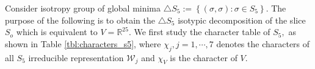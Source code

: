 \documentclass{amsart}%
\begin{document}
Consider isotropy group of global minima
$\triangle{S}_5:=\left\{(\sigma,\sigma): \sigma \in S_5 \right\}.$
 The purpose of the following is to obtain the $\triangle{S}_5$ isotypic decomposition of the slice $S_o$ which is equivalent to $V=\mathbb R^{25}$. We first study the character table of ${S}_5,$ as shown in Table \eqref{tbl:characters_s5}, where $\chi_j,j=1,\cdots,7$ denotes the characters of all $S_5$ irreducible representation $\mathcal{W}_j$ and $\mathcal{\chi}_{V}$ is the character of $V.$

\begin{table}[H] 
\centering
{}
\caption{Character Table of $S_5$}
\label{tbl:characters_s5}
\end{table}
\end{document}
